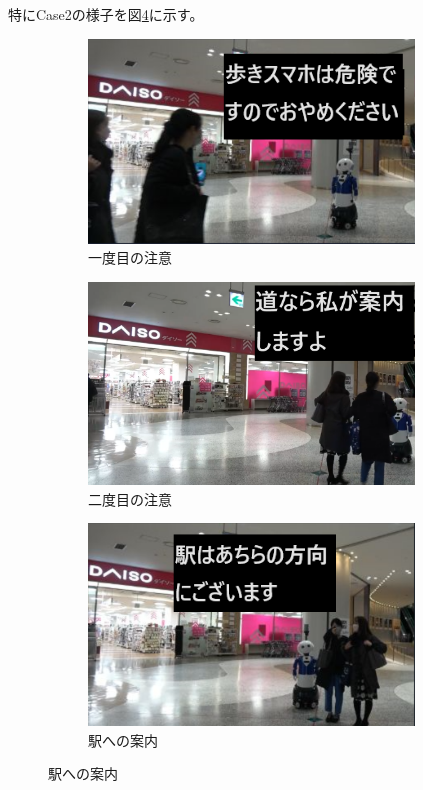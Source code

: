 \documentclass{kuisthesis}
\begin{document}
特にCase2の様子を図\ref{fig: Case2}に示す。
\begin{figure}[H]
  \centering
  \begin{subfigure}{0.33\textwidth}
    \centering
    \includegraphics[width=0.95\textwidth]{img/Case2-1.png}
    \caption{一度目の注意}
    \label{fig: Case2_1}
  \end{subfigure}
  \begin{subfigure}{0.33\textwidth}
    \centering
    \includegraphics[width=0.95\textwidth]{img/Case2-2.png}
    \caption{二度目の注意}
    \label{fig: Case2_2}
  \end{subfigure}
  \begin{subfigure}{0.33\textwidth}
    \centering
    \includegraphics[width=0.95\textwidth]{img/Case2-3.png}
    \caption{駅への案内}
    \label{fig: Case2_3}
  \end{subfigure}
  \label{fig: Case2}
\end{figure}
\end{document}
